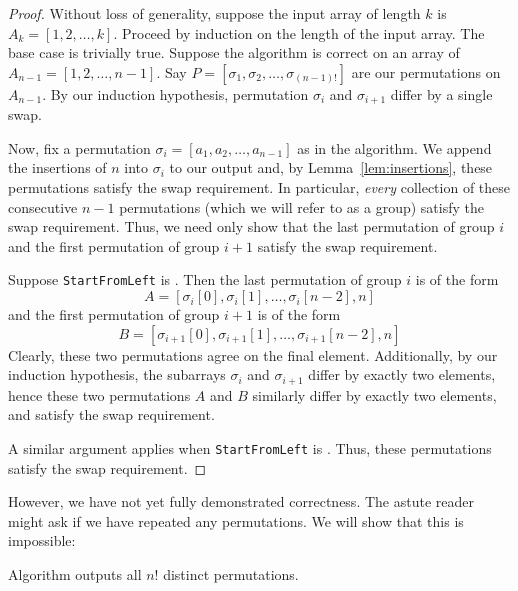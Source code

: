 \documentclass[final]{article}
\begin{document}
\begin{proof}
    Without loss of generality, suppose the input array of length $k$ is $A_k = [1, 2, \dots, k]$. Proceed by induction on the length of the input array. The base case is trivially true. Suppose the algorithm is correct on an array of $A_{n-1} = [1, 2, \dots,  n - 1]$. Say $P = [\sigma_1, \sigma_2, \dots, \sigma_{(n-1)!}]$ are our permutations on $A_{n-1}$. By our induction hypothesis, permutation $\sigma_i$ and $\sigma_{i + 1}$ differ by a single swap.

    Now, fix a permutation $\sigma_i = [a_1, a_2, \dots, a_{n-1}]$ as in the algorithm. We append the insertions of $n$ into $\sigma_i$ to our output and, by Lemma~\ref{lem:insertions}, these permutations satisfy the swap requirement. In particular, \emph{every} collection of these consecutive $n - 1$ permutations (which we will refer to as a group) satisfy the swap requirement. Thus, we need only show that the last permutation of group $i$ and the first permutation of group $i + 1$ satisfy the swap requirement.

    Suppose \texttt{StartFromLeft} is \True. Then the last permutation of group $i$ is of the form \[A = [\sigma_i[0], \sigma_i[1], \dots, \sigma_i[n - 2], n]\] and the first permutation of group $i + 1$ is of the form \[B = [\sigma_{i+1}[0], \sigma_{i+1}[1], \dots, \sigma_{i+1}[n - 2], n]\] Clearly, these two permutations agree on the final element. Additionally, by our induction hypothesis, the subarrays $\sigma_i$ and $\sigma_{i+1}$ differ by exactly two elements, hence these two permutations $A$ and $B$ similarly differ by exactly two elements, and satisfy the swap requirement.

    A similar argument applies when \texttt{StartFromLeft} is \False. Thus, these permutations satisfy the swap requirement.
\end{proof}

However, we have not yet fully demonstrated correctness. The astute reader might ask if we have repeated any permutations. We will show that this is impossible:

\begin{theorem}{}{}
    Algorithm  outputs all $n!$ distinct permutations.
\end{theorem}
\end{document}
